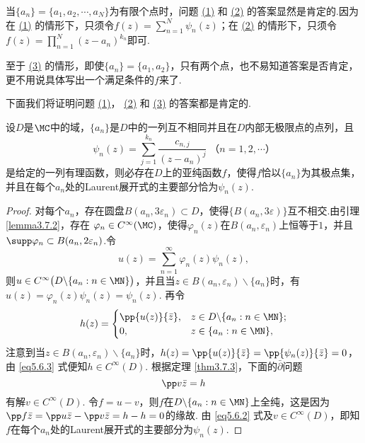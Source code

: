 当$\{a_n\}=\{a_1,a_2,\cdots,a_N\}$为有限个点时，问题 \hyperlink{5.6.1}{(1)} 和 \hyperlink{5.6.2}{(2)} 的答案显然是肯定的.因为在 \hyperlink{5.6.1}{(1)} 的情形下，只须令$f(z)=\sum_{n=1}^N\psi_n(z)$；在 \hyperlink{5.6.2}{(2)}  的情形下，只须令$f(z)=\prod_{n=1}^N(z-a_n)^{k_n}$即可.

至于 \hyperlink{5.6.3}{(3)} 的情形，即使$\{a_n\}=\{a_1,a_2\}$，只有两个点，也不易知道答案是否肯定，更不用说具体写出一个满足条件的$f$来了.

下面我们将证明问题 \hyperlink{5.6.1}{(1)}， \hyperlink{5.6.2}{(2)} 和  \hyperlink{5.6.3}{(3)} 的答案都是肯定的.

\begin{theorem}\label{thm5.6.2}
设$D$是$\MC$中的域，$\{a_n\}$是$D$中的一列互不相同并且在$D$内部无极限点的点列，且
\begin{equation}\label{eq5.6.1}
\psi_n(z)=\sum_{j=1}^{k_n}\frac{c_{n,j}}{(z-a_n)^j}\;\mbox{（$n=1,2,\cdots$）}
\end{equation}
是给定的一列有理函数，则必存在$D$上的亚纯函数$f$，使得$f$恰以$\{a_n\}$为其极点集，并且在每个$a_n$处的Laurent展开式的主要部分恰为$\psi_n(z)$.
\end{theorem}
\begin{proof}
对每个$a_n$，存在圆盘$B(a_n,3\varepsilon_n)\subset D$，使得$\{B(a_n,3\varepsilon)\}$互不相交.由引理 \ref{lemma3.7.2}，存在 $\varphi_n\in C^\infty(\MC)$，使得$\varphi_n(z)$在$B(a_n,\varepsilon_n)$上恒等于$1$，并且$\supp\varphi_n \subset B(a_n,2\varepsilon_n)$.令
\begin{equation}\label{eq5.6.2}
u(z)=\sum_{n=1}^\infty\varphi_n(z)\psi_n(z),
\end{equation}
则$u\in C^\infty\big(D\backslash\{a_n:n\in\MN\}\big)$，并且当$z\in B(a_n,\varepsilon_n)\backslash\{a_n\}$时，有$u(z)=\varphi_n(z)\psi_n(z)=\psi_n(z)$. 再令
\begin{equation}\label{eq5.6.3}
h(z)=\begin{cases}
\pp{u(z)}{\bar z},&z\in D\backslash\{a_n:n\in\MN\};\\
0,&z\in\{a_n:n\in\MN\},
\end{cases}
\end{equation}
注意到当$z\in B(a_n,\varepsilon_n)\backslash\{a_n\}$时，$h(z)=\pp{u(z)}{\bar z}
=\pp{\psi_n(z)}{\bar z}=0$，由 \eqref{eq5.6.3} 式便知$h\in C^\infty(D)$. 根据定理 \ref{thm3.7.3}，下面的$\bar\partial$问题
\[\pp v{\bar z}=h\]
有解$v\in C^\infty(D)$. 令$f=u-v$，则$f$在$D\backslash\{a_n:n\in\MN\}$上全纯，这是因为
$\pp f{\bar z}=\pp u{\bar z}-\pp v{\bar z}=h-h=0$的缘故. 由 \eqref{eq5.6.2} 式及$v\in C^\infty(D)$，即知$f$在每个$a_n$处的Laurent展开式的主要部分为$\psi_n(z)$.
\end{proof}

